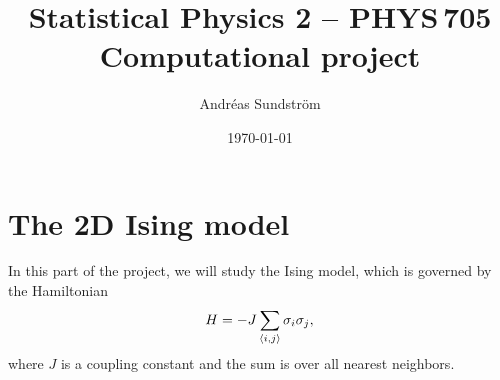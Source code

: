 \documentclass[11pt,letter, swedish, english
]{article}
\begin{document}




\title{Statistical Physics 2 -- PHYS\,705 \\
Computational project}
\author{Andréas Sundström}
\date{\today}

\maketitle


\section{The 2D Ising model}

In this part of the project, we will study the Ising model, which is
governed by the Hamiltonian
\begin{equation}
H=-J\sum_{\ev{i, j}} \sigma_i\sigma_j,
\end{equation}
where $J$ is a coupling constant and the sum is over all nearest
neighbors. 



\end{document}
